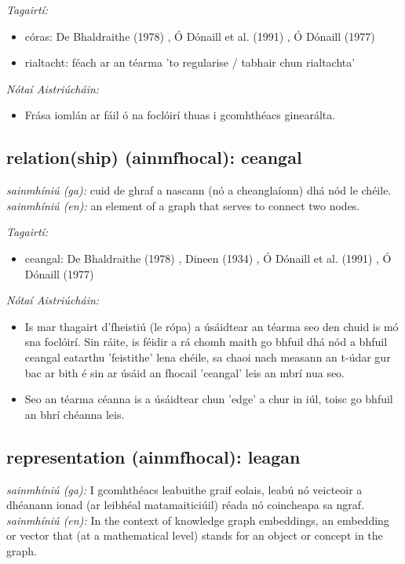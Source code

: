 \documentclass{article}
\begin{document}
 \noindent \textit{Tagairtí:}
\begin{itemize}
	\item córas: De Bhaldraithe (1978) \cite{de-bhaldraithe}, Ó Dónaill et al. (1991) \cite{focloir-beag}, Ó Dónaill (1977) \cite{odonaill}
	\item rialtacht: féach ar an téarma 'to regularise / tabhair chun rialtachta'
\end{itemize}

 \noindent \textit{Nótaí Aistriúcháin:}
\begin{itemize}
	\item Frása iomlán ar fáil ó na foclóirí thuas i gcomhthéacs ginearálta.
\end{itemize}


\subsection*{relation(ship) (ainmfhocal): ceangal} 
 \noindent \textit{sainmhíniú (ga):} cuid de ghraf a nascann (nó a cheanglaíonn) dhá nód le chéile.
\newline\newline
 \noindent \textit{sainmhíniú (en):} an element of a graph that serves to connect two nodes.
\newline

 \noindent \textit{Tagairtí:}
\begin{itemize}
	\item ceangal: De Bhaldraithe (1978) \cite{de-bhaldraithe}, Dineen (1934) \cite{dineen}, Ó Dónaill et al. (1991) \cite{focloir-beag}, Ó Dónaill (1977) \cite{odonaill}
\end{itemize}

 \noindent \textit{Nótaí Aistriúcháin:}
\begin{itemize}
	\item Is mar thagairt d'fheistiú (le rópa) a úsáidtear an téarma seo den chuid is mó sna foclóirí. Sin ráite, is féidir a rá chomh maith go bhfuil dhá nód a bhfuil ceangal eatarthu 'feistithe' lena chéile, sa chaoi nach measann an t-údar gur bac ar bith é sin ar úsáid an fhocail 'ceangal' leis an mbrí nua seo.
	\item Seo an téarma céanna is a úsáidtear chun 'edge' a chur in iúl, toisc go bhfuil an bhrí chéanna leis.
\end{itemize}


\subsection*{representation (ainmfhocal): leagan} 
 \noindent \textit{sainmhíniú (ga):} I gcomhthéacs leabuithe graif eolais, leabú nó veicteoir a dhéanann ionad (ar leibhéal matamaiticiúil) réada nó coincheapa sa ngraf.
\newline\newline
 \noindent \textit{sainmhíniú (en):} In the context of knowledge graph embeddings, an embedding or vector that (at a mathematical level) stands for an object or concept in the graph.
\newline
\end{document}
